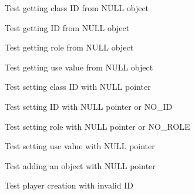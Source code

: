 \begin{DoxyRefList}
%
Test getting class ID from NULL object  
\item[Global \doxylink{object__test_8c_a1ff250f0f43297f57fcce1f3a6ae490b}{test2\+\_\+object\+\_\+get\+\_\+id} ()]\label{test__test000116}%
%
Test getting ID from NULL object  
\item[Global \doxylink{object__test_8c_a6211e84944f89844529bd220492e9b7e}{test2\+\_\+object\+\_\+get\+\_\+role} ()]\label{test__test000124}%
%
Test getting role from NULL object  
\item[Global \doxylink{object__test_8c_ad75034dd6344c028a5805e7d6af23920}{test2\+\_\+object\+\_\+get\+\_\+use\+\_\+value} ()]\label{test__test000128}%
%
Test getting use value from NULL object  
\item[Global \doxylink{object__test_8c_a94947641df66c4f3f38c7720a7d7dde1}{test2\+\_\+object\+\_\+set\+\_\+class\+\_\+id} ()]\label{test__test000122}%
%
Test setting class ID with NULL pointer  
\item[Global \doxylink{object__test_8c_a1f0cfd69428a6cf954fe37c9c21f8cb3}{test2\+\_\+object\+\_\+set\+\_\+id} ()]\label{test__test000118}%
%
Test setting ID with NULL pointer or NO\+\_\+\+ID  
\item[Global \doxylink{object__test_8c_ac0a0e5442507ecc608fb6543e31bd314}{test2\+\_\+object\+\_\+set\+\_\+role} ()]\label{test__test000126}%
%
Test setting role with NULL pointer or NO\+\_\+\+ROLE  
\item[Global \doxylink{object__test_8c_ae09e3800d553d0fafa4faae0ec7d0b1e}{test2\+\_\+object\+\_\+set\+\_\+use\+\_\+value} ()]\label{test__test000130}%
%
Test setting use value with NULL pointer  
\item[Global \doxylink{player__test_8c_a864d3935cf61953950b10df0e656306d}{test2\+\_\+player\+\_\+add\+\_\+object} ()]\label{test__test000144}%
%
Test adding an object with NULL pointer  
\item[Global \doxylink{player__test_8c_a4f6eca5f9d8c08d2a7fc70c209ecf854}{test2\+\_\+player\+\_\+create} ()]\label{test__test000132}%
%
Test player creation with invalid ID  
\item[Global \doxylink{player__test_8c_a68e87f4f56c421b94269841c5f1ef6c3}{test2\+\_\+player\+\_\+delete\+\_\+object} ()]\label{test__test000146}%
%

\end{DoxyRefList}

